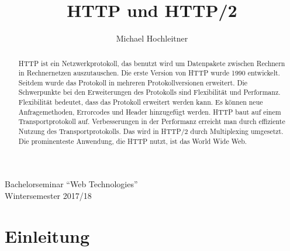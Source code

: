 \documentclass{llncs}
\begin{document}
\title{HTTP und HTTP/2}
\author{Michael Hochleitner}

\maketitle 
\begin{center}
Bachelorseminar ``Web Technologies'' \\
Wintersemester 2017/18
\end{center}

\begin{abstract}
HTTP ist ein Netzwerkprotokoll, das benutzt wird um Datenpakete zwischen Rechnern in Rechnernetzen auszutauschen. Die erste Version von HTTP wurde 1990 entwickelt. Seitdem wurde das Protokoll in mehreren Protokollversionen erweitert. Die Schwerpunkte bei den Erweiterungen des Protokolls sind Flexibilität und Performanz. Flexibilität bedeutet, dass das Protokoll erweitert werden kann. Es können neue Anfragemethoden, Errorcodes und Header hinzugefügt werden. HTTP baut auf einem Transportprotokoll auf. Verbesserungen in der Performanz erreicht man durch effiziente Nutzung des Transportprotokolls. Das wird in HTTP/2 durch Multiplexing umgesetzt. Die prominenteste Anwendung, die HTTP nutzt, ist das World Wide Web.
\end{abstract}

\section{Einleitung}
\end{document}
